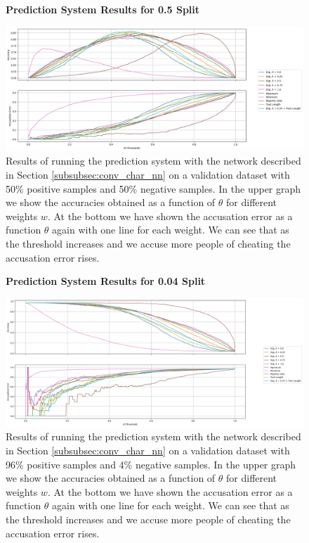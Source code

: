 \begin{figure}
    \centering
    \textbf{Prediction System Results for 0.5 Split}\par\medskip
    \includegraphics[width=\textwidth]{./pictures/experiments/conv_char_nn/prediction_system_50.png}
    \caption{Results of running the prediction system with the network described
        in Section \ref{subsubsec:conv_char_nn} on a validation dataset with
        50\% positive samples and 50\% negative samples. In the upper graph we
        show the accuracies obtained as a function of $\theta$ for different
        weights $w$. At the bottom we have shown the accusation error as a
        function $\theta$ again with one line for each weight. We can see that
        as the threshold increases and we accuse more people of cheating the
        accusation error rises.}
    \label{fig:conv-char-NN-pred-50}
\end{figure}

\begin{figure}
    \centering
    \textbf{Prediction System Results for 0.04 Split}\par\medskip
    \includegraphics[width=\textwidth]{./pictures/experiments/conv_char_nn/prediction_system_04.png}
    \caption{Results of running the prediction system with the network described
        in Section \ref{subsubsec:conv_char_nn} on a validation dataset with
        96\% positive samples and 4\% negative samples. In the upper graph we
        show the accuracies obtained as a function of $\theta$ for different
        weights $w$. At the bottom we have shown the accusation error as a
        function $\theta$ again with one line for each weight. We can see that
        as the threshold increases and we accuse more people of cheating the
        accusation error rises.}
    \label{fig:conv-char-NN-pred-4}
\end{figure}

